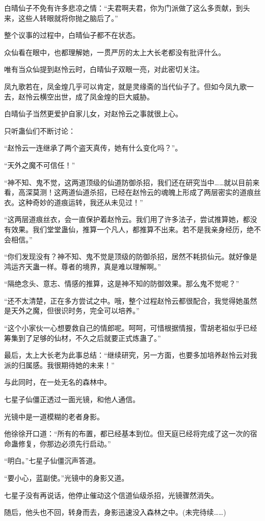 \begin{this_body}
白晴仙子不免有许多悲凉之情：“夫君啊夫君，你为门派做了这么多贡献，到头来，这些人转眼就将你抛之脑后了。”

整个议事的过程中，白晴仙子都不在状态。

众仙看在眼中，也都理解她，一贯严厉的太上大长老都没有批评什么。

唯有当众仙提到赵怜云时，白晴仙子双眼一亮，对此密切关注。

凤九歌若在，凤金煌几乎可以肯定，就是灵缘斋的当代仙子了。但如今凤九歌一去，赵怜云横空出世，成了凤金煌的巨大威胁。

白晴仙子当然更爱护自家儿女，对赵怜云之事就很上心。

只听蛊仙们不断讨论：

“赵怜云一连继承了两个盗天真传，她有什么变化吗？”。

“天外之魔不可信任！”

“神不知、鬼不觉，这两道顶级的仙道防御杀招，我们还在研究当中……就以目前来看，高深莫测！这两道仙道杀招，已经在赵怜云的魂魄上形成了两层密实的道痕丝衣。这种奇妙的道痕运转，我还从未见过！”

“这两层道痕丝衣，会一直保护着赵怜云。我们用了许多法子，尝试推算她，都没有效果。我们堂堂蛊仙，推算一个凡人，都推算不出来。若不是我亲身经历，绝不会相信。”

“你们发现没有？神不知、鬼不觉是顶级的防御杀招，居然不耗损仙元。就好像是鸿运齐天蛊一样。尊者的境界，真是难以理解啊。”

“隔绝念头、意志、情感的推算，这是神不知的防御效果。那么鬼不觉呢？”

“还不太清楚，正在多方尝试之中。哦，整个过程赵怜云都很配合，我觉得她虽然是天外之魔，但很识时务，完全可以培养。”

“这个小家伙一心想要救自己的情郎呢。呵呵，可惜根据情报，雪胡老祖似乎已经筹集到了足够的仙材，不久之后就要正式炼蛊了。”

最后，太上大长老为此事总结：“继续研究，另一方面，也要多加培养赵怜云对我派的归属感。我很期待她的未来！”

与此同时，在一处无名的森林中。

七星子仙僵正透过一面光镜，和他人通信。

光镜中是一道模糊的老者身影。

他徐徐开口道：“所有的布置，都已经基本到位。但天庭已经将完成了这一次的宿命蛊修复，你那边必须先行启动。”

“明白。”七星子仙僵沉声答道。

“要小心，蓝副使。”光镜中的身影又道。

七星子没有再说话，他停止催动这个信道仙级杀招，光镜骤然消失。

随后，他头也不回，转身而去，身影迅速没入森林之中。(未完待续……)

\end{this_body}

